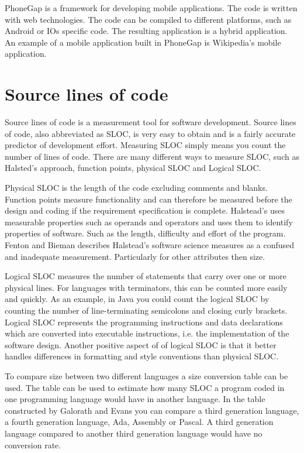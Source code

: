 PhoneGap is a framework for developing mobile applications. The code is written with web technologies. The code can be compiled to different platforms, such as Android or IOs specific code. The resulting application is a hybrid application. An example of a mobile application built in PhoneGap is Wikipedia's mobile application.

\section{Source lines of code}
Source lines of code is a measurement tool for software development. Source lines of code, also abbreviated as SLOC, is very easy to obtain and is a fairly accurate predictor of development effort\cite[p.~63]{galorath2006}. Measuring SLOC simply means you count the number of lines of code. There are many different ways to measure SLOC, such as Halsted’s approach, function points, physical SLOC and Logical SLOC. 

Physical SLOC is the length of the code excluding comments and blanks. Function points measure functionality and can therefore be measured before the design and coding if the requirement specification is complete\cite[p.~187]{galorath2006}. Halstead’s uses measurable properties such as operands and operators and uses them to identify properties of software. Such as the length, difficulty and effort of the program. Fenton and Bieman describes Halstead’s software science measures as a confused and inadequate measurement. Particularly for other attributes then size\cite[p.~345]{fenton2015}.

Logical SLOC measures the number of statements that carry over one or more physical lines.  For languages with terminators, this can be counted more easily and quickly. As an example, in Java you could count the logical SLOC by counting the number of line-terminating semicolons and closing curly brackets. Logical SLOC represents the programming instructions and data declarations which are converted into executable instructions, i.e. the implementation of the software design. Another positive aspect of of logical SLOC is that it better handles differences in formatting and style conventions than physical SLOC\cite[p.~155]{galorath2006}.

To compare size between two different languages a size conversion table can be used. The table can be used to estimate how many SLOC a program coded in one programming language would have in another language. In the table constructed by Galorath and Evans you can compare a third generation language, a fourth generation language, Ada, Assembly or Pascal\cite[p.~163]{galorath2006}. A third generation language compared to another third generation language would have no conversion rate. 

